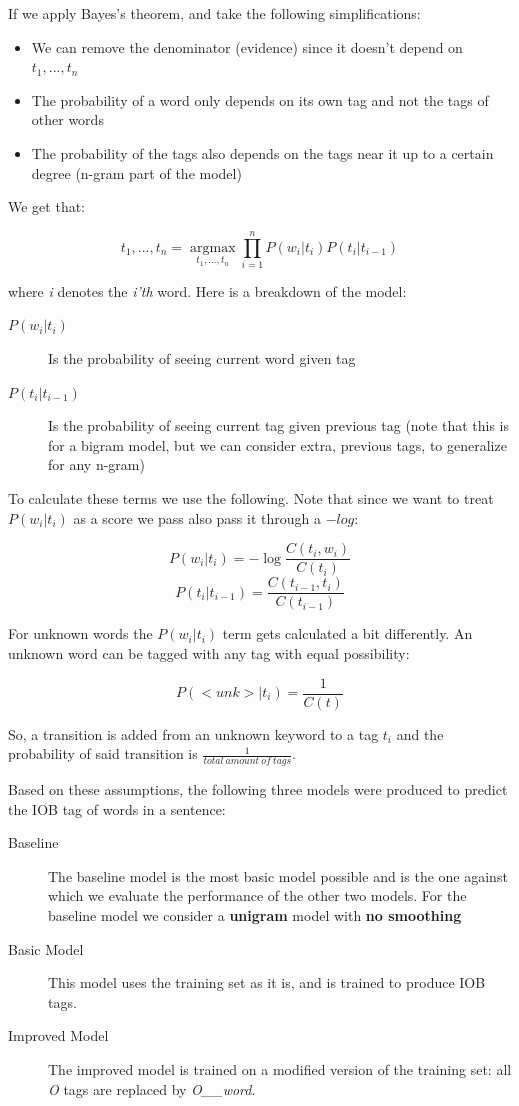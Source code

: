 \documentclass[11pt,a4paper]{article}
\begin{document}
	If we apply Bayes's theorem, and take the following simplifications:
	
	\begin{itemize}
		\item We can remove the denominator (evidence) since it doesn't depend on $t_1,...,t_n$
		\item The probability of a word only depends on its own tag and not the tags of other words
		\item The probability of the tags also depends on the tags near it up to a certain degree (n-gram part of the model)
	\end{itemize}
	
	We get that:
	
	$$
	 t_1, ... , t_n = \operatorname*{argmax}_{t_1,...,t_n} 
	 \prod_{i=1}^{n} P(w_i | t_i) P(t_i | t_{i-1})
	$$

	where \textit{i} denotes the \textit{i'th} word. Here is a breakdown of the model:
	
	\begin{description}
		\item[$P(w_i|t_i)$] Is the probability of seeing current word given tag
		\item[$P(t_i|t_{i-1})$] Is the probability of seeing current tag given previous tag (note that this is for a bigram model, but we can consider extra, previous tags, to generalize for any n-gram)
	\end{description}
	
	To calculate these terms we use the following. Note that since we want to treat $P(w_i|t_i)$ as a score we pass also pass it through a $-log$:
	
	$$
	P(w_i|t_i) = -\log \frac{C(t_i, w_i)}{C(t_i)}
	$$
	$$
	P(t_i|t_{i-1}) = \frac{C(t_{i-1}, t_i)}{C(t_{i-1})}
	$$
	
	For unknown words the $P(w_i|t_i)$ term gets calculated a bit differently. An unknown word can be tagged with any tag with equal possibility:
	
	$$
	P(<unk>|t_i) = \frac{1}{C(t)}
	$$
	
	So, a transition is added from an unknown keyword to a tag $t_i$ and the probability of said transition is $\frac{1}{total\ amount\ of\ tags}$.
	
	Based on these assumptions, the following three models were produced to predict the IOB tag of words in a sentence:
	
	\begin{description}
		\item[Baseline] The baseline model is the most basic model possible and is the one against which we evaluate the performance of the other two models. For the baseline model we consider a \textbf{unigram} model with \textbf{no smoothing}
		\item[Basic
		 Model] This model uses the training set as it is, and is trained to produce IOB tags. 
		\item[Improved Model] The improved model is trained on a modified version of the training set: all \textit{O} tags are replaced by \textit{O\_\_word}. 
	\end{description}
\end{document}
